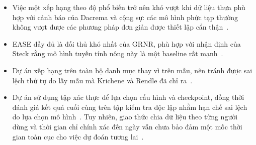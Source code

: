 \begin{itemize}
\item Việc một xếp hạng theo độ phổ biến trở nên khó vượt khi dữ liệu thưa phù hợp với cảnh báo của Dacrema và cộng sự: các mô hình phức tạp thường không vượt được các phương pháp đơn giản được thiết lập cẩn thận~\cite{dacrema2019progress}.
\item EASE đầy đủ là đối thủ khó nhất của GRNR, phù hợp với nhận định của Steck rằng mô hình tuyến tính nông này là một baseline rất mạnh~\cite{steck2019ease}.
\item Dự án xếp hạng trên toàn bộ danh mục thay vì trên mẫu, nên tránh được sai lệch thứ tự do lấy mẫu mà Krichene và Rendle đã chỉ ra~\cite{krichene2020sampled}.
\item Dự án sử dụng tập xác thực để lựa chọn cấu hình và checkpoint, đồng thời đánh giá kết quả cuối cùng trên tập kiểm tra độc lập nhằm hạn chế sai lệch do lựa chọn mô hình~\cite{sun2020rigorous}.  Tuy nhiên, giao thức chia dữ liệu theo từng người dùng và thời gian chỉ chính xác đến ngày vẫn chưa bảo đảm một mốc thời gian toàn cục cho việc dự đoán tương lai~\cite{ji2023leakage}.
\end{itemize}

\FloatBarrier
